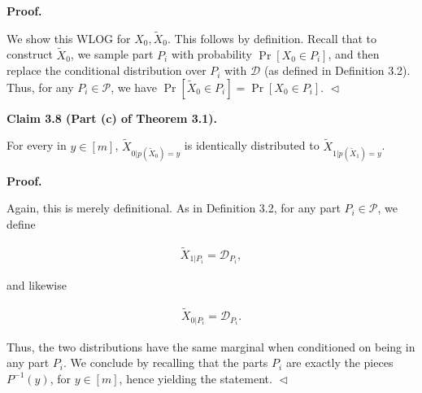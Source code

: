 \documentclass[10pt,a4paper]{article}
\begin{document}




\par\medskip\noindent\textbf{
\textbf{Proof}.}\par




We show this WLOG for $X_{0},\widetilde{X}_{0}$. This follows by definition. Recall that to construct $\widetilde{X}_{0}$, we sample part $P_{i}$ with probability $\Pr[X_{0}\in P_{i}]$, and then replace the conditional distribution over $P_{i}$ with $\mathcal{D}$ (as defined in Definition 3.2). Thus, for any $P_{i}\in\mathcal{P}$, we have $\Pr[\widetilde{X}_{0}\in P_{i}]=\Pr[X_{0}\in P_{i}]$.
$\vartriangleleft$\par





\par\medskip\noindent\textbf{
Claim 3.8 (Part (c) of Theorem 3.1). 
}\par



For every in $y\in[m]$, $\widetilde{X}_{0|p(\widetilde{X}_{0})=y}$ is identically distributed to $\widetilde{X}_{1|p(\widetilde{X}_{1})=y}$.\par







\par\medskip\noindent\textbf{
\textbf{Proof}.}\par




Again, this is merely definitional. As in Definition 3.2, for any part $P_{i}\in\mathcal{P}$, we define\par


\[\begin{gathered}
\widetilde{X}_{1|P_{i}}=\mathcal{D}_{P_{i}},
\end{gathered}\]


and likewise\par


\[\begin{gathered}
\widetilde{X}_{0|P_{i}}=\mathcal{D}_{P_{i}}.
\end{gathered}\]


Thus, the two distributions have the same marginal when conditioned on being in any part $P_{i}$. We conclude by recalling that the parts $P_{i}$ are exactly the pieces $P^{-1}(y)$, for $y\in[m]$, hence yielding the statement.
$\vartriangleleft$\par
\end{document}
